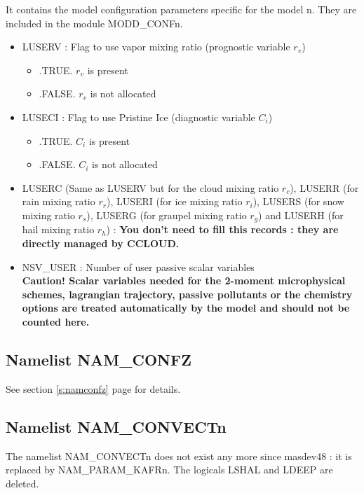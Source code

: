It contains the model configuration parameters specific for the  model n. They
are included in the module MODD\_CONFn. 
\begin{itemize}
\item
{}
LUSERV : Flag to use vapor mixing ratio (prognostic variable $r_v$)
\begin{itemize}
\item   .TRUE. $r_v$ is present
\item   .FALSE. $r_v$ is not allocated
\end{itemize}
\item
LUSECI : Flag to use Pristine Ice (diagnostic variable $C_i$)
\begin{itemize}
\item   .TRUE. $C_i$ is present
\item   .FALSE. $C_i$ is not allocated
\end{itemize}
\item LUSERC (Same as LUSERV but for the cloud mixing ratio $r_c$), LUSERR (for rain mixing ratio $r_r$), LUSERI (for ice mixing ratio $r_i$), LUSERS (for snow mixing ratio $r_s$), LUSERG (for graupel mixing ratio $r_g$) and LUSERH (for hail mixing ratio $r_h$) : {\bf You don't need to fill this records : they are directly managed by CCLOUD.}
\item
NSV\_USER  : Number of user passive scalar variables \\
{\bf Caution! Scalar variables needed for the 2-moment microphysical schemes,
lagrangian trajectory, passive pollutants or the chemistry options are treated automatically by the model and
should not be counted here. }
\end{itemize}

\subsection{Namelist NAM\_CONFZ}
See section \ref{s:namconfz} page \pageref{s:namconfz} for details.

\subsection{Namelist NAM\_CONVECTn}
The namelist NAM\_CONVECTn does not exist any more since masdev48 : it is replaced by NAM\_PARAM\_KAFRn.
The logicals LSHAL and LDEEP are deleted.
